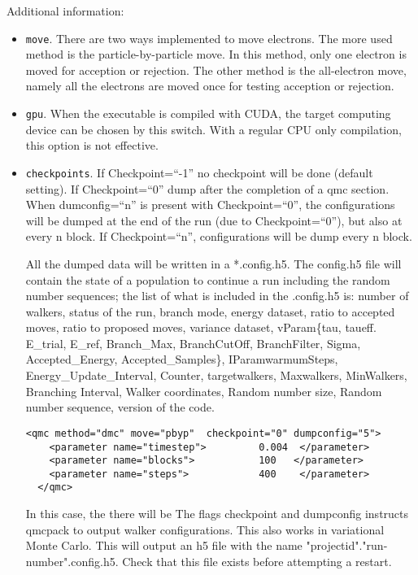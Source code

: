 Additional information:
\begin{itemize}
\item \texttt{move}. There are two ways implemented to move electrons. The more used method is the particle-by-particle move. In this method, only one electron is moved for acception or rejection. The other method is the all-electron move, namely all the electrons are moved once for testing acception or rejection.

\item \texttt{gpu}. When the executable is compiled with CUDA, the target computing device can be chosen by this switch. With a regular CPU only compilation, this option is not effective.

\item \texttt{checkpoints}. If Checkpoint=``-1'' no checkpoint will be done (default setting). If Checkpoint=``0'' dump after the completion of a qmc section. When dumconfig=``n'' is present with Checkpoint=``0'', the configurations will be dumped at the end of the run (due to Checkpoint=``0''), but also at every n block. If Checkpoint=``n'', configurations will be dump every n block. 

All the dumped data will be written in a *.config.h5. The config.h5 file will contain the state of a population to continue a run including the random number sequences; the list of what is included in the .config.h5 is: number of walkers, status of the run, branch mode, energy dataset, ratio to accepted moves, ratio to proposed moves, variance dataset, vParam\{tau, taueff. E\_trial, E\_ref, Branch\_Max, BranchCutOff, BranchFilter, Sigma, Accepted\_Energy, Accepted\_Samples\}, IParam{warmumSteps, Energy\_Update\_Interval, Counter, targetwalkers, Maxwalkers, MinWalkers, Branching Interval}, Walker coordinates, Random number size, Random number sequence, version of the code.

\begin{lstlisting}[caption=The following is an example of running a simulation that can be restarted . ]
  <qmc method="dmc" move="pbyp"  checkpoint="0" dumpconfig="5">
    <parameter name="timestep">         0.004  </parameter>
    <parameter name="blocks">           100   </parameter>
    <parameter name="steps">            400    </parameter>
  </qmc>
\end{lstlisting}

In this case, the there will be 
The flags checkpoint and dumpconfig instructs qmcpack to output walker configurations.  This also
works in variational Monte Carlo.  This will output an h5 file with the name "projectid"."run-number".config.h5.
Check that this file exists before attempting a restart.


\end{itemize}
